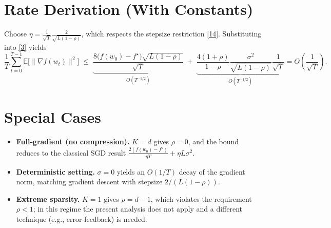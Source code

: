 \documentclass{article}
\begin{document}
\section*{Rate Derivation (With Constants)}
Choose $\eta = \frac{1}{\sqrt{T}}\frac{2}{\sqrt{L(1-\rho)}}$, which respects the stepsize
restriction \eqref{14}.  Substituting into \eqref{3} yields
\[
\frac{1}{T}\sum_{t=0}^{T-1}\mathbb{E}\big[\|\nabla f(w_t)\|^{2}\big]
\;\le\;
\underbrace{\frac{8\big(f(w_0)-f^\star\big)\sqrt{L(1-\rho)}}{\sqrt{T}}}_{O(T^{-1/2})}
\;+\;
\underbrace{\frac{4(1+\rho)}{1-\rho}\frac{\sigma^{2}}{\sqrt{L(1-\rho)}}\frac{1}{\sqrt{T}}}_{O(T^{-1/2})}
=O\!\left(\frac{1}{\sqrt{T}}\right).
\]

\section*{Special Cases}
\begin{itemize}
\item \textbf{Full‑gradient (no compression).} $K=d$ gives $\rho=0$, and the bound reduces to the classical SGD result $\frac{2(f(w_0)-f^\star)}{\eta T}+\eta L\sigma^{2}$.
\item \textbf{Deterministic setting.} $\sigma=0$ yields an $O(1/T)$ decay of the gradient norm, matching gradient descent with stepsize $2/(L(1-\rho))$.
\item \textbf{Extreme sparsity.} $K=1$ gives $\rho=d-1$, which violates the requirement $\rho<1$; in this regime the present analysis does not apply and a different technique (e.g., error‑feedback) is needed.
\end{itemize}
\end{document}
